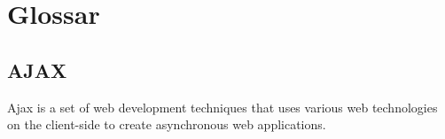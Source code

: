 \clearpage
{}
\chapter*{Glossar}
%
\section*{AJAX}
\label{sec:appendix:ajax}
Ajax is a set of web development techniques that uses various web technologies on the client-side to create asynchronous web applications.

